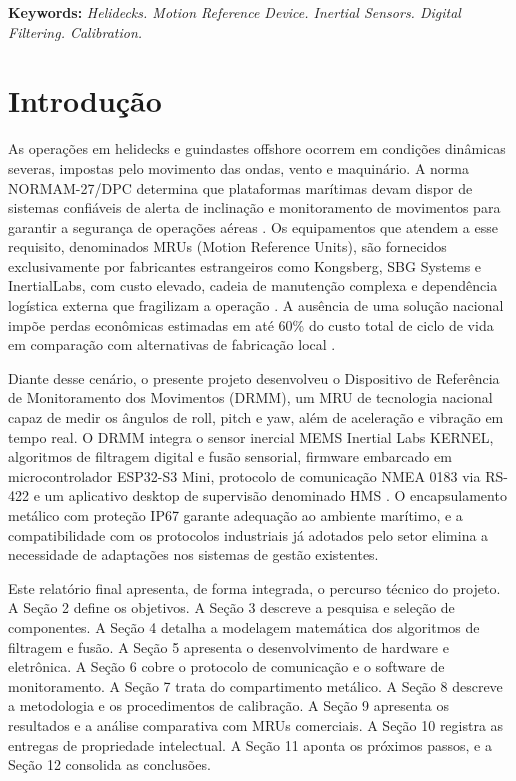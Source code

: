 \documentclass[a4paper, 12pt]{article}
\begin{document}
\vspace{0.3cm}
\noindent\textbf{Keywords:} \textit{Helidecks. Motion Reference Device. Inertial Sensors. Digital Filtering. Calibration.}

\newpage
\raggedright
\justifying
\normalsize

\section{Introdução}

As operações em helidecks e guindastes offshore ocorrem em condições dinâmicas severas, impostas pelo movimento das ondas, vento e maquinário. A norma NORMAM-27/DPC determina que plataformas marítimas devam dispor de sistemas confiáveis de alerta de inclinação e monitoramento de movimentos para garantir a segurança de operações aéreas \cite{marinha2017}. Os equipamentos que atendem a esse requisito, denominados MRUs (Motion Reference Units), são fornecidos exclusivamente por fabricantes estrangeiros como Kongsberg, SBG Systems e InertialLabs, com custo elevado, cadeia de manutenção complexa e dependência logística externa que fragilizam a operação \cite{shima2008}. A ausência de uma solução nacional impõe perdas econômicas estimadas em até 60\% do custo total de ciclo de vida em comparação com alternativas de fabricação local \cite{fm2s2015}.

Diante desse cenário, o presente projeto desenvolveu o Dispositivo de Referência de Monitoramento dos Movimentos (DRMM), um MRU de tecnologia nacional capaz de medir os ângulos de roll, pitch e yaw, além de aceleração e vibração em tempo real. O DRMM integra o sensor inercial MEMS Inertial Labs KERNEL, algoritmos de filtragem digital e fusão sensorial, firmware embarcado em microcontrolador ESP32-S3 Mini, protocolo de comunicação NMEA 0183 via RS-422 e um aplicativo desktop de supervisão denominado HMS \cite{macario2006}. O encapsulamento metálico com proteção IP67 garante adequação ao ambiente marítimo, e a compatibilidade com os protocolos industriais já adotados pelo setor elimina a necessidade de adaptações nos sistemas de gestão existentes.

Este relatório final apresenta, de forma integrada, o percurso técnico do projeto. A Seção 2 define os objetivos. A Seção 3 descreve a pesquisa e seleção de componentes. A Seção 4 detalha a modelagem matemática dos algoritmos de filtragem e fusão. A Seção 5 apresenta o desenvolvimento de hardware e eletrônica. A Seção 6 cobre o protocolo de comunicação e o software de monitoramento. A Seção 7 trata do compartimento metálico. A Seção 8 descreve a metodologia e os procedimentos de calibração. A Seção 9 apresenta os resultados e a análise comparativa com MRUs comerciais. A Seção 10 registra as entregas de propriedade intelectual. A Seção 11 aponta os próximos passos, e a Seção 12 consolida as conclusões.
\end{document}
